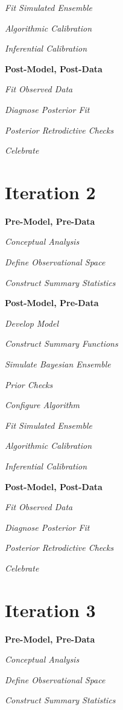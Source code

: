 \documentclass[11pt, oneside, openany]{scrbook}
\begin{document}
\emph{Fit Simulated Ensemble}

\emph{Algorithmic Calibration}

\emph{Inferential Calibration}

\textbf{Post-Model, Post-Data}

\emph{Fit Observed Data}

\emph{Diagnose Posterior Fit}

\emph{Posterior Retrodictive Checks}

\emph{Celebrate}

\hypertarget{iter2}{%
\section{Iteration 2}\label{iter2}}

\textbf{Pre-Model, Pre-Data}

\emph{Conceptual Analysis}

\emph{Define Observational Space}

\emph{Construct Summary Statistics}

\textbf{Post-Model, Pre-Data}

\emph{Develop Model}

\emph{Construct Summary Functions}

\emph{Simulate Bayesian Ensemble}

\emph{Prior Checks}

\emph{Configure Algorithm}

\emph{Fit Simulated Ensemble}

\emph{Algorithmic Calibration}

\emph{Inferential Calibration}

\textbf{Post-Model, Post-Data}

\emph{Fit Observed Data}

\emph{Diagnose Posterior Fit}

\emph{Posterior Retrodictive Checks}

\emph{Celebrate}

\hypertarget{iter3}{%
\section{Iteration 3}\label{iter3}}

\textbf{Pre-Model, Pre-Data}

\emph{Conceptual Analysis}

\emph{Define Observational Space}

\emph{Construct Summary Statistics}
\end{document}
